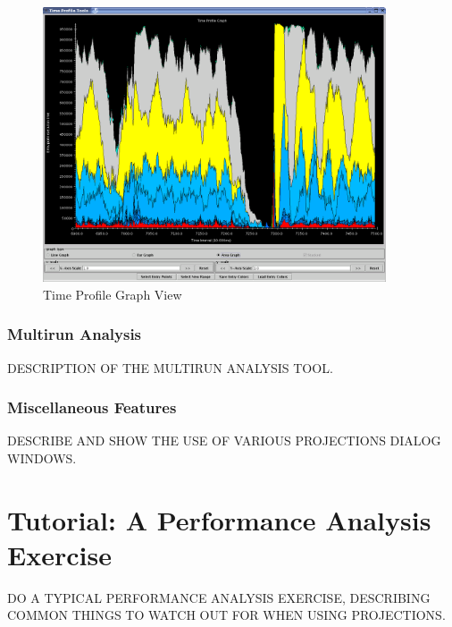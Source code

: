 \documentclass[10pt]{article}
\begin{document}
\begin{figure}[htb]
\center
\includegraphics[width=4.0in]{fig/timeprofile}
\caption{Time Profile Graph View}
\label{time profile}
\end{figure}

\subsubsection{Multirun Analysis}

DESCRIPTION OF THE MULTIRUN ANALYSIS TOOL.

\subsubsection{Miscellaneous Features}

DESCRIBE AND SHOW THE USE OF VARIOUS PROJECTIONS DIALOG WINDOWS.

\section{Tutorial: A Performance Analysis Exercise}

DO A TYPICAL PERFORMANCE ANALYSIS EXERCISE, DESCRIBING COMMON THINGS TO
WATCH OUT FOR WHEN USING PROJECTIONS.
\end{document}
